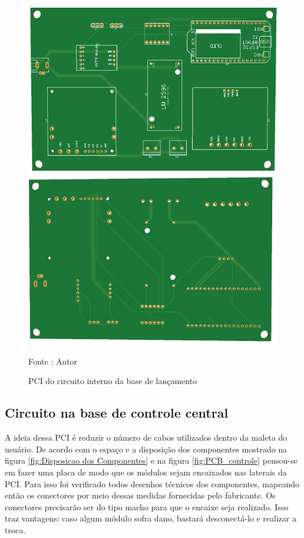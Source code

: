 \begin{figure}[H]
  \centering
  \includegraphics[scale=0.4]{figuras/PDFs/final eletronica/BASE_TOP.png}
    \includegraphics[scale=0.4]{figuras/PDFs/final eletronica/BASE_BOTTOM.png}
  \caption{PCI do circuito interno da base de lançamento } 
  {\footnotesize Fonte : Autor } 
  \label{fig:PCB_BASE_LANCAMENTO}
\end{figure}

\subsection{Circuito na base de controle central}

A ideia dessa PCI é reduzir o número de cabos utilizados dentro da maleta do usuário.
De acordo com o espaço e a disposição dos componentes mostrado na figura  \ref{fig:Disposicao dos Componentes} e na figura \ref{fig:PCB_controle} pensou-se em fazer uma placa de modo que os módulos sejam encaixados nas laterais da PCI. Para isso foi verificado todos desenhos técnicos dos componentes, mapeando então os conectores  por meio dessas medidas fornecidas pelo fabricante. Os conectores precisarão ser do tipo macho para que o encaixe seja realizado. Isso traz vantagens: caso algum módulo sofra dano, bastará  desconectá-lo e realizar a troca.

